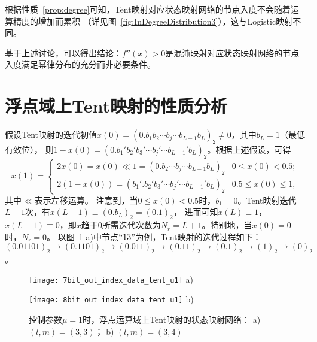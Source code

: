 根据性质~\ref{prop:degree}可知，Tent映射对应状态映射网络的节点入度不会随着运算精度的增加而累积
（详见图~\ref{fig:InDegreeDistribution3}），这与Logistic映射不同。

基于上述讨论，可以得出结论：$f''(x)>0$是混沌映射对应状态映射网络的节点入度满足幂律分布的充分而非必要条件。

\section{浮点域上Tent映射的性质分析}

假设Tent映射的迭代初值$x(0)=(0.b_1b_2\cdots b_j\cdots b_{L-1}b_L)_2\neq 0$，其中$b_L=1$（最低有效位），
则$1-x(0)=(0.b_1'b_2'b_3'\cdots b_j'\cdots b_{L-1}'b_L)_2$。根据上述假设，可得
\begin{equation*}
x(1)=\begin{cases} 2x(0)=x(0)\ll 1=(0.b_2\cdots b_j\cdots b_{L-1}b_L)_2  &  0\leq x(0)<0.5;\\
2(1-x(0))=(b_1'.b_2'b_3'\cdots b_j'\cdots b_{L-1}'b_L)_2                 &  0.5\leq x(0)\leq 1,
\end{cases}
\end{equation*}
其中$\ll$表示左移运算。
注意到，当$0\leq x(0)<0.5$时，$b_1=0$。Tent映射迭代$L-1$次，有$x(L-1)\equiv(0.b_L)_2=(0.1)_2$，
进而可知$x(L)\equiv 1$，$x(L+1)\equiv 0$，即$x$趋于0所需迭代次数为$N_r=L+1$。特别地，当$x(0)=0$时，$N_r=0$。
以图~\ref{fig:networkTent7and8bitsu1} a)中节点$``13"$为例，Tent映射的迭代过程如下：
$(0.01101)_{2}\rightarrow (0.1101)_{2}\rightarrow (0.011)_{2}\rightarrow
(0.11)_{2}\rightarrow (0.1)_{2}\rightarrow (1)_{2}\rightarrow (0)_{2}$。

\begin{figure}[!htb]
\centering
\begin{minipage}{\BigTwoImW}
\centering
\texttt{[image: 7bit\_out\_index\_data\_tent\_u1]}
a)
\end{minipage}
\begin{minipage}{\BigTwoImW}
\centering
\texttt{[image: 8bit\_out\_index\_data\_tent\_u1]}
b)
\end{minipage}
\caption{控制参数$\mu=1$时，浮点运算域上Tent映射的状态映射网络：
a) $(l,m)=(3,3)$； b) $(l,m)=(3,4)$}
\label{fig:networkTent7and8bitsu1}
\end{figure}

